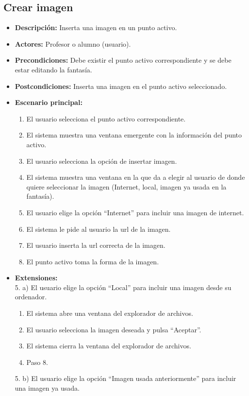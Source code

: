 \documentclass[12pt,letterpaper]{article}
\begin{document}
\subsection{Crear imagen}
\begin{itemize}
	\item \textbf{Descripción:} Inserta una imagen en un punto activo.
	\item \textbf{Actores:} Profesor o alumno (usuario).
	\item \textbf{Precondiciones:} Debe existir el punto activo correspondiente y se debe estar editando la fantasía.
	\item \textbf{Postcondiciones:} Inserta una imagen en el punto activo seleccionado.
	\item \textbf{Escenario principal:}
	\begin{enumerate}
		\item El usuario selecciona el punto activo correspondiente.
		\item El sistema muestra una ventana emergente con la información del punto activo.
		\item El usuario selecciona la opción de insertar imagen.
		\item El sistema muestra una ventana en la que da a elegir al usuario de donde quiere seleccionar la imagen (Internet, local, imagen ya usada en la fantasía).
		\item El usuario elige la opción ``Internet'' para incluir una imagen de internet.
		\item El sistema le pide al usuario la url de la imagen.
		\item El usuario inserta la url correcta de la imagen.
		\item El punto activo toma la forma de la imagen.
	\end{enumerate}
	\item \textbf{Extensiones:} \\5. a) El usuario elige la opción ``Local'' para incluir una imagen desde su ordenador.
	\begin{enumerate}
		\item El sistema abre una ventana del explorador de archivos.
		\item El usuario selecciona la imagen deseada y pulsa ``Aceptar''.
		\item El sistema cierra la ventana del explorador de archivos.
		\item Paso 8.
	\end{enumerate}
	5. b) El usuario elige la opción ``Imagen usada anteriormente'' para incluir una imagen ya usada.

\end{itemize}
\end{document}
